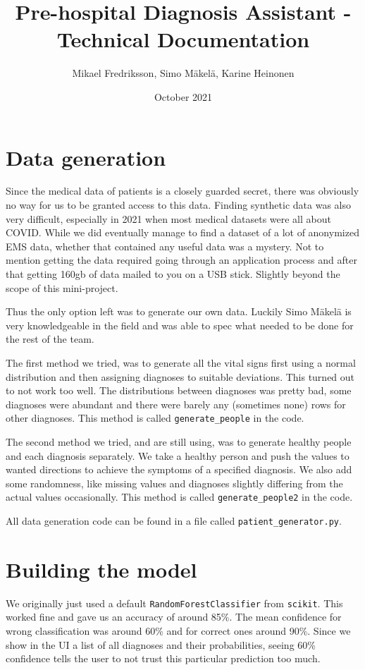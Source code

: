 \documentclass{article}
\title{Pre-hospital Diagnosis Assistant - Technical Documentation}
\author{Mikael Fredriksson, Simo Mäkelä, Karine Heinonen}
\date{October 2021}
\begin{document}
\maketitle

\section{Data generation}
Since the medical data of patients is a closely guarded secret, there was obviously no way for us to be granted access to this data. Finding synthetic data was also very difficult, especially in 2021 when most medical datasets were all about COVID. While we did eventually manage to find a dataset of a lot of anonymized EMS data, whether that contained any useful data was a mystery. Not to mention getting the data required going through an application process and after that getting 160gb of data mailed to you on a USB stick. Slightly beyond the scope of this mini-project.

Thus the only option left was to generate our own data. Luckily Simo Mäkelä is very knowledgeable in the field and was able to spec what needed to be done for the rest of the team.

The first method we tried, was to generate all the vital signs first using a normal distribution and then assigning diagnoses to suitable deviations. This turned out to not work too well. The distributions between diagnoses was pretty bad, some diagnoses were abundant and there were barely any (sometimes none) rows for other diagnoses. This method is called \texttt{generate\_people} in the code.

The second method we tried, and are still using, was to generate healthy people and each diagnosis separately. We take a healthy person and push the values to wanted directions to achieve the symptoms of a specified diagnosis. We also add some randomness, like missing values and diagnoses slightly differing from the actual values occasionally. This method is called \texttt{generate\_people2} in the code.

All data generation code can be found in a file called \texttt{patient\_generator.py}.

\section{Building the model}
We originally just used a default \texttt{RandomForestClassifier} from \texttt{scikit}. This worked fine and gave us an accuracy of around 85\%. The mean confidence for wrong classification was around 60\% and for correct ones around 90\%. Since we show in the UI a list of all diagnoses and their probabilities, seeing 60\% confidence tells the user to not trust this particular prediction too much.
\end{document}
